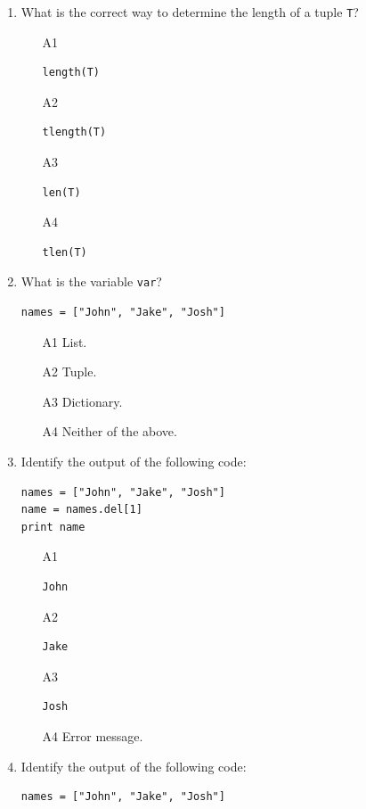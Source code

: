 \begin{enumerate}
\item What is the correct way to determine the length of a tuple {\tt T}?
\begin{enumerate}
\item[A1] 
\begin{verbatim}
length(T)
\end{verbatim}
\item[A2] 
\begin{verbatim}
tlength(T)
\end{verbatim}
\item[A3] 
\begin{verbatim}
len(T)
\end{verbatim}
\item[A4] 
\begin{verbatim}
tlen(T)
\end{verbatim}
\end{enumerate}
\item What is the variable {\tt var}?
\begin{verbatim}
names = ["John", "Jake", "Josh"]
\end{verbatim}
\begin{enumerate}
\item[A1] List.
\item[A2] Tuple.
\item[A3] Dictionary.
\item[A4] Neither of the above.
\end{enumerate}
\item Identify the output of the following code:
\begin{verbatim}
names = ["John", "Jake", "Josh"]
name = names.del[1]
print name
\end{verbatim}
\begin{enumerate}
\item[A1] 
\begin{verbatim}
John
\end{verbatim}
\item[A2] 
\begin{verbatim}
Jake
\end{verbatim}
\item[A3] 
\begin{verbatim}
Josh
\end{verbatim}
\item[A4] Error message.
\end{enumerate}
\item Identify the output of the following code:
\begin{verbatim}
names = ["John", "Jake", "Josh"]

\end{verbatim}
\end{enumerate}
